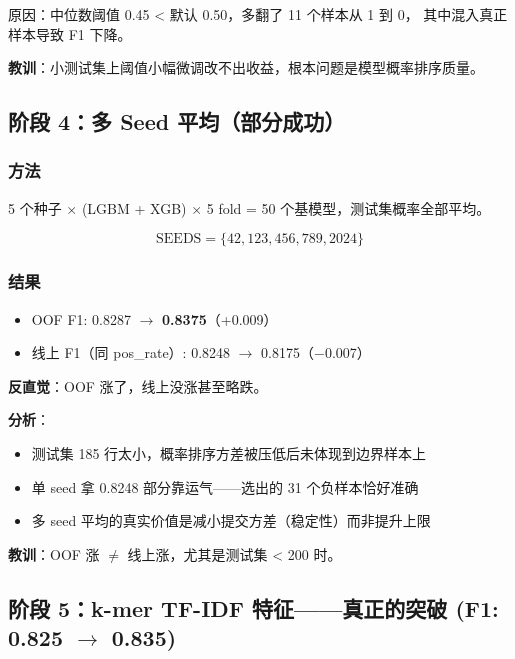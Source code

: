 \documentclass[11pt,a4paper]{article}
\begin{document}
原因：中位数阈值 0.45 < 默认 0.50，多翻了 11 个样本从 1 到 0，
其中混入真正样本导致 F1 下降。

\textbf{教训}：小测试集上阈值小幅微调改不出收益，根本问题是模型概率排序质量。

\subsection{阶段 4：多 Seed 平均（部分成功）}

\subsubsection{方法}

5 个种子 $\times$ (LGBM + XGB) $\times$ 5 fold = 50 个基模型，测试集概率全部平均。

$$\text{SEEDS} = \{42, 123, 456, 789, 2024\}$$

\subsubsection{结果}

\begin{itemize}[nosep]
    \item OOF F1: 0.8287 $\to$ \textbf{0.8375}（+0.009）
    \item 线上 F1（同 pos\_rate）: 0.8248 $\to$ 0.8175（$-$0.007）
\end{itemize}

\textbf{反直觉}：OOF 涨了，线上没涨甚至略跌。

\textbf{分析}：
\begin{itemize}[nosep]
    \item 测试集 185 行太小，概率排序方差被压低后未体现到边界样本上
    \item 单 seed 拿 0.8248 部分靠运气——选出的 31 个负样本恰好准确
    \item 多 seed 平均的真实价值是减小提交方差（稳定性）而非提升上限
\end{itemize}

\textbf{教训}：OOF 涨 $\neq$ 线上涨，尤其是测试集 < 200 时。

\subsection{阶段 5：k-mer TF-IDF 特征——真正的突破 (F1: 0.825 $\to$ 0.835)}
\end{document}
